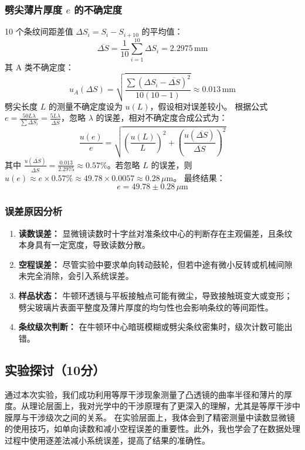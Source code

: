 \documentclass[]{../template/Report}%
\begin{document}
\begin{fullreportonly}
\subsubsection{劈尖薄片厚度 $e$ 的不确定度}
10 个条纹间距差值 $\Delta S_i = S_i - S_{i+10}$ 的平均值：
\[ \overline{\Delta S} = \frac{1}{10} \sum_{i=1}^{10} \Delta S_i = 2.2975 \, \text{mm} \]
其 A 类不确定度：
\[ u_A(\Delta S) = \sqrt{\frac{\sum (\Delta S_i - \overline{\Delta S})^2}{10(10-1)}} \approx 0.013 \, \text{mm} \]
劈尖长度 $L$ 的测量不确定度设为 $u(L)$，假设相对误差较小。
根据公式 $e = \frac{50 L \lambda}{\sum \Delta S_i} = \frac{5 L \lambda}{\overline{\Delta S}}$，忽略 $\lambda$ 的误差，相对不确定度合成公式为：
\[ \frac{u(e)}{e} = \sqrt{\left(\frac{u(L)}{L}\right)^2 + \left(\frac{u(\overline{\Delta S})}{\overline{\Delta S}}\right)^2} \]
其中 $\frac{u(\overline{\Delta S})}{\overline{\Delta S}} = \frac{0.013}{2.2975} \approx 0.57\%$。若忽略 $L$ 的误差，则 $u(e) \approx e \times 0.57\% \approx 49.78 \times 0.0057 \approx 0.28 \, \mu\text{m}$。
最终结果：
\[ e = 49.78 \pm 0.28 \, \mu\text{m} \]

\subsubsection{误差原因分析}
\begin{enumerate}
    \item \textbf{读数误差：} 显微镜读数时十字丝对准条纹中心的判断存在主观偏差，且条纹本身具有一定宽度，导致读数分散。
    \item \textbf{空程误差：} 尽管实验中要求单向转动鼓轮，但若中途有微小反转或机械间隙未完全消除，会引入系统误差。
    \item \textbf{样品状态：} 牛顿环透镜与平板接触点可能有微尘，导致接触斑变大或变形；劈尖玻璃片表面平整度及薄片厚度的均匀性也会影响条纹的等间距性。
    \item \textbf{条纹级次判断：} 在牛顿环中心暗斑模糊或劈尖条纹密集时，级次计数可能出错。
\end{enumerate}
\subsection{实验探讨（10分）}
通过本次实验，我们成功利用等厚干涉现象测量了凸透镜的曲率半径和薄片的厚度。从理论层面上，我对光学中的干涉原理有了更深入的理解，尤其是等厚干涉中膜厚与干涉级次之间的关系。
在实验层面上，我体会到了精密测量中读数显微镜的使用技巧，如单向读数和减小空程误差的重要性。此外，我也学会了在数据处理过程中使用逐差法减小系统误差，提高了结果的准确性。


\end{fullreportonly}
\end{document}
